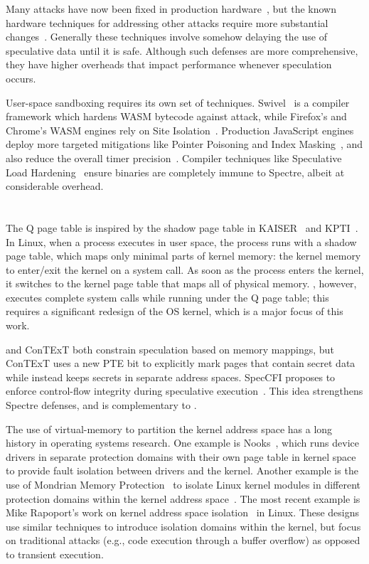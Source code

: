 Many attacks have now been fixed in production hardware~\cite{intel:affected-processors}, but 
the known hardware techniques for addressing other attacks require more substantial changes~\cite{barber:specshield, weisse:nda, ainsworth:muontrap,yu:stt,yu:sdo}.
Generally these techniques involve somehow delaying the use of speculative data until it is safe.
Although such defenses are more comprehensive, they have higher overheads that impact performance whenever speculation occurs.

User-space sandboxing requires its own set of techniques.
Swivel~\cite{narayan:swivel} is a compiler framework which hardens WASM bytecode against attack, while
Firefox's and Chrome's WASM engines rely on Site Isolation~\cite{reis:site-isolation}.
Production JavaScript engines deploy more targeted mitigations like Pointer Poisoning and Index Masking~\cite{webkit:spectre-meltdown}, and also reduce the overall timer precision~\cite{mozilla:timer-precision, webkit:spectre-meltdown}.
Compiler techniques like Speculative Load Hardening~\cite{carruth:slh} ensure binaries are completely immune to Spectre, albeit at considerable overhead.

\section{\sys}

The Q page table is inspired by the shadow page table in
KAISER~\cite{gruss:kaiser} and KPTI~\cite{linux:kpti}. In Linux, when
a process executes in user space, the process runs with a shadow
page table, which maps only minimal parts of kernel memory: the kernel
memory to enter/exit the kernel on a system call. As soon as the process
enters the kernel, it switches to the kernel page table that maps all
of physical memory.  \sys, however, executes complete system
calls while running under the Q page table; this requires a significant
redesign of the OS kernel, which is a major focus of this work.

\sys and ConTExT both constrain speculation based on memory mappings, but ConTExT uses a new PTE bit to explicitly mark pages that contain secret data~\cite{ConTExT} while \sys instead keeps secrets in separate address spaces.
SpecCFI proposes to enforce control-flow integrity during speculative execution~\cite{koruyeh:speccfi}.
This idea strengthens Spectre defenses, and is complementary to \sys.

The use of virtual-memory to partition the kernel address space has a
long history in operating systems research.  One example is
Nooks~\cite{swift:nooks-tocs}, which runs device drivers in separate
protection domains with their own page table in kernel space to
provide fault isolation between drivers and the kernel.  Another
example is the use of Mondrian Memory Protection~\cite{witchel:mmp} to
isolate Linux kernel modules in different protection domains within
the kernel address space~\cite{witchel:mondrix}.  The most
recent example is Mike Rapoport's work on kernel address space
isolation~\cite{lwn:beyond-kpti} in Linux.  These designs use similar
techniques to introduce isolation domains within the kernel, but focus
on traditional attacks (e.g., code execution through a buffer overflow)
as opposed to transient execution.

